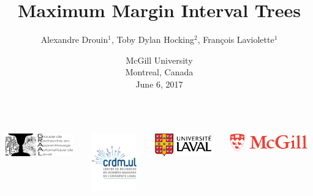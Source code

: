 \documentclass{beamer}
\begin{document}
\title[MMIT]{Maximum Margin Interval Trees}
\author[Drouin et al.]{Alexandre Drouin{\tiny $^1$}, Toby Dylan Hocking{\tiny $^2$}, Fran\c{c}ois Laviolette{\tiny $^1$}}
\date[June 6, 2017]{\vskip 3mm \small McGill University\\Montreal, Canada\\June 6, 2017}

\AtBeginSection{\frame{\sectionpage}}

\begin{frame}
\titlepage
\begin{center}
\vspace{3mm}
\begin{columns}
\begin{column}{0.2\textwidth}
\vspace{1mm}
\includegraphics[width=\textwidth,height=1cm]{graal.pdf}
\end{column}
\begin{column}{0.2\textwidth}
\vspace{-3mm}
\includegraphics[width=\textwidth,height=2.5cm]{crdmul_fr.pdf}
\end{column}
\begin{column}{0.2\textwidth}
\hspace{-2mm}
\includegraphics[width=\textwidth,height=1cm]{ul.pdf}
\end{column}
\begin{column}{0.3\textwidth}
	\hspace{-2mm}
	\includegraphics[width=\textwidth,height=0.8cm]{mcgill_logo.pdf}
\end{column}
\end{columns}
\end{center}
\end{frame}
\end{document}
